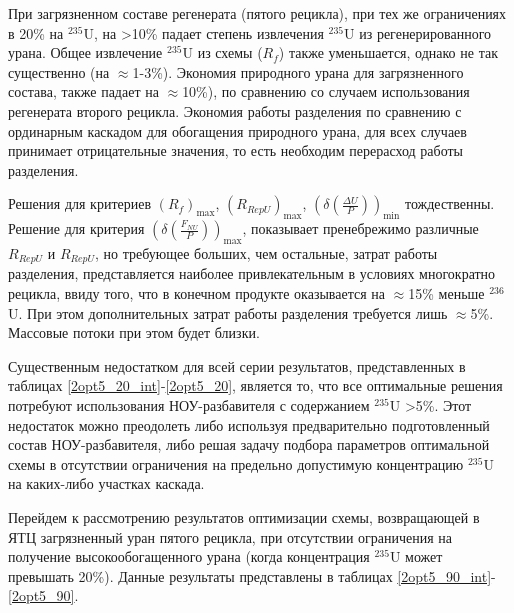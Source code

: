 При загрязненном составе регенерата (пятого рецикла), при тех же ограничениях в 20\% на $^{235}$U, на >10\% падает степень извлечения $^{235}$U из регенерированного урана. Общее извлечение  $^{235}$U из схемы ($R_f$) также уменьшается, однако не так существенно (на $\approx$1-3\%). Экономия природного урана для загрязненного состава, также падает на $\approx$10\%), по сравнению со случаем использования регенерата второго рецикла. Экономия работы разделения по сравнению с ординарным каскадом для обогащения природного урана, для всех случаев принимает отрицательные значения, то есть необходим перерасход работы разделения.

Решения для критериев $(R_f)_\text{max}$, $(R_{RepU})_\text{max}$, $(\delta(\frac{\Delta U}{P}))_\text{min}$ тождественны. Решение для критерия $(\delta(\frac{F_{NU}}{P}))_\text{max}$, показывает пренебрежимо различные $R_{RepU}$ и $R_{RepU}$, но требующее больших, чем остальные, затрат работы разделения, представляется наиболее привлекательным в условиях многократно рецикла, ввиду того, что в конечном продукте оказывается на $\approx$15\% меньше $^{236}$U. При этом дополнительных затрат работы разделения требуется лишь $\approx$5\%. Массовые потоки при этом будет близки.

Существенным недостатком для всей серии результатов, представленных в таблицах \ref*{2opt5_20_int}-\ref*{2opt5_20}, является то, что все оптимальные решения потребуют использования НОУ-разбавителя с содержанием $^{235}$U >5\%. Этот недостаток можно преодолеть либо используя предварительно подготовленный состав НОУ-разбавителя, либо решая задачу подбора параметров оптимальной схемы в отсутствии ограничения на предельно допустимую концентрацию $^{235}$U на каких-либо участках каскада.

Перейдем к рассмотрению результатов оптимизации схемы, возвращающей в ЯТЦ загрязненный уран пятого рецикла, при отсутствии ограничения на получение высокообогащенного урана (когда концентрация $^{235}$U может превышать 20\%). Данные результаты представлены в таблицах \ref*{2opt5_90_int}-\ref*{2opt5_90}.


